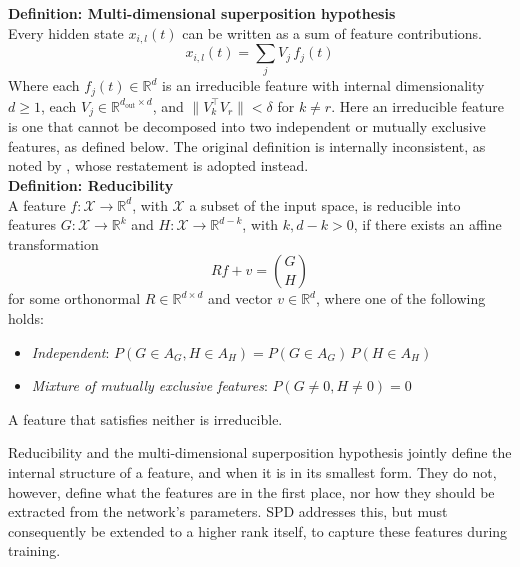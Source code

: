 \documentclass{article}
\begin{document}
\textbf{Definition: Multi-dimensional superposition hypothesis}\\
Every hidden
state $x_{i,l}(t)$ can be written as a sum of feature contributions.
\begin{equation}
    x_{i,l}(t) = \sum_j V_j \, f_j(t)
\end{equation}
Where each $f_j(t) \in \mathbb{R}^{d}$ is an irreducible feature with
internal dimensionality $d \geq 1$, each $V_j \in \mathbb{R}^{d_\text{out} \times d}$,
and $\| V_k^\top V_r \| < \delta$ for $k \neq r$.
Here an irreducible feature is one that cannot be decomposed 
into two independent or mutually exclusive features, as defined
below. The original definition is internally inconsistent,
as noted by \textcite{busch2025}, whose restatement
is adopted instead.\\

\textbf{Definition: Reducibility} \\
A feature $f: \mathcal{X} \to \mathbb{R}^{d}$,
with $\mathcal{X}$ a subset of the input space, is reducible into features
$G:\mathcal{X}\to\mathbb{R}^{k}$ and $H:\mathcal{X}\to\mathbb{R}^{d-k}$, with
$k, d-k > 0$, if there exists an affine transformation
\begin{equation}
    Rf + v = \binom{G}{H}
\end{equation}
for some orthonormal $R \in \mathbb{R}^{d \times d}$ and vector
$v \in \mathbb{R}^{d}$, where one of the following holds:
\begin{itemize}
    \setlength\itemsep{0em}
    \item \textit{Independent}: $P(G \in A_{G}, H \in A_{H}) = P(G \in A_{G})\,P(H \in A_{H})$
    \item \textit{Mixture of mutually exclusive features}: $P(G \neq 0, H \neq 0) = 0$
\end{itemize}
A feature that satisfies neither is irreducible.

Reducibility and the multi-dimensional superposition hypothesis
jointly define the internal structure of a feature, and
when it is in its smallest form. They do not, however,
define what the features are in the first place, nor how they
should be extracted from the network's parameters. SPD addresses
this, but must consequently be extended to a higher rank itself,
to capture these features during training.
\end{document}
